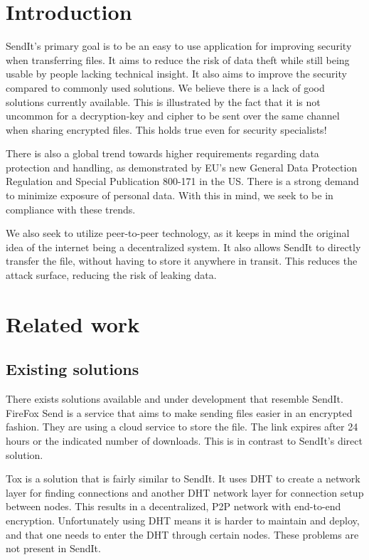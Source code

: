 \documentclass[letterpaper, 10 pt, conference]{ieeeconf}  %
\begin{document}
\section{Introduction}
%
SendIt's primary goal is to be an easy to use application for improving security when transferring files. It aims to reduce the risk of data theft while still being usable by people lacking technical insight. It also aims to improve the security compared to commonly used solutions. We believe there is a lack of good solutions currently available. This is illustrated by the fact that it is not uncommon for a decryption-key and cipher to be sent over the same channel when sharing encrypted files. This holds true even for security specialists! 

There is also a global trend towards higher requirements regarding data protection and handling, as demonstrated by EU's new General Data Protection Regulation \cite{law_gdpr,ar_gdpr} and Special Publication 800-171 in the US. \cite{law_sp800} There is a strong demand to minimize exposure of personal data. With this in mind, we seek to be in compliance with these trends. 

We also seek to utilize peer-to-peer technology, as it keeps in mind the original idea of the internet being a decentralized system. \cite{ar_decent} It also allows SendIt to directly transfer the file, without having to store it anywhere in transit. This reduces the attack surface, reducing the risk of leaking data.
%
\section{Related work}
%
\subsection{Existing solutions}
There exists solutions available and under development that resemble SendIt. FireFox Send \cite{url_firesend} is a service that aims to make sending files easier in an encrypted fashion. They are using a cloud service to store the file. The link expires after 24 hours or the indicated number of downloads. This is in contrast to SendIt's direct solution.

Tox is a solution that is fairly similar to SendIt. It uses DHT to create a network layer for finding connections and another DHT network layer for connection setup between nodes. This results in a decentralized, P2P network with end-to-end encryption. Unfortunately using DHT means it is harder to maintain and deploy, and that one needs to enter the DHT through certain nodes. These problems are not present in SendIt. \cite{url_tox,url_toxdoc}
\end{document}
